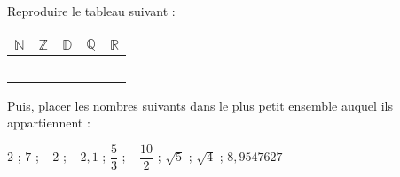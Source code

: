 \documentclass{beamer}
\begin{document}
\begin{frame}

	Reproduire le tableau suivant :

	\vspace{1em}

	\renewcommand{\arraystretch}{1.3}
	\newcommand{\myPadding}{ \hspace{1.5em} }
	\begin{tabular}{|c|c|c|c|c|}
		\hline
		\myPadding$ℕ$\myPadding & \myPadding$ℤ$\myPadding & \myPadding$𝔻$\myPadding & \myPadding$ℚ$\myPadding & \myPadding$ℝ$\myPadding \\ \hline
		                        &                         &                         &                         &                         \\
		                        &                         &                         &                         &                         \\
		                        &                         &                         &                         &                         \\
		                        &                         &                         &                         &                         \\
		                        &                         &                         &                         &                         \\ \hline
	\end{tabular}

	\vspace{1em}

	Puis, placer les nombres suivants dans le plus petit ensemble auquel ils appartiennent :

	$2$ ; $7$ ; $-2$ ; $-2,1$ ; $\dfrac{5}{3}$ ; $-\dfrac{10}{2}$ ; $\sqrt{5}$ ; $\sqrt{4}$ ; $8,9547627$
\end{frame}
\end{document}
